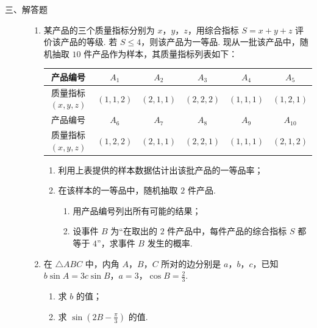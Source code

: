 \begin{description}

    \item[三、解答题]

    \begin{enumerate}[leftmargin=5pt]

      \addtocounter{enumi}{+14}

        \item 某产品的三个质量指标分别为 \(x\)，\(y\)，\(z\)，用综合指标 \(S = x + y + z\) 评价该产品的等级. 若 \(S \leqslant 4\)，则该产品为一等品. 现从一批该产品中，随机抽取 \(10\) 件产品作为样本，其质量指标列表如下：

\begin{center}
\begingroup
\small
\renewcommand{\arraystretch}{1.2}
\begin{tabular}{|c|c|c|c|c|c|}
\hline
产品编号 & \(A_1\) & \(A_2\) & \(A_3\) & \(A_4\) & \(A_5\) \\
\hline
质量指标 \((x,y,z)\) & \((1,1,2)\) & \((2,1,1)\) & \((2,2,2)\) & \((1,1,1)\) & \((1,2,1)\) \\
\hline
产品编号 & \(A_6\) & \(A_7\) & \(A_8\) & \(A_9\) & \(A_{10}\) \\
\hline
质量指标 \((x,y,z)\) & \((1,2,2)\) & \((2,1,1)\) & \((2,2,1)\) & \((1,1,1)\) & \((2,1,2)\) \\
\hline
\end{tabular}
\endgroup
\end{center}

\begin{enumerate}
\item 利用上表提供的样本数据估计出该批产品的一等品率；
\item 在该样本的一等品中，随机抽取 \(2\) 件产品.
\begin{enumerate}
\item 用产品编号列出所有可能的结果；
\item 设事件 \(B\) 为“在取出的 \(2\) 件产品中，每件产品的综合指标 \(S\) 都等于 \(4\)”，求事件 \(B\) 发生的概率.
\end{enumerate}
\end{enumerate}

        \item 在 \(\triangle ABC\) 中，内角 \(A\)，\(B\)，\(C\) 所对的边分别是 \(a\)，\(b\)，\(c\)，已知 \(b \sin A = 3c \sin B\)，\(a = 3\)，\(\cos B = \frac{2}{3}\).
\begin{enumerate}
\item 求 \(b\) 的值；
\item 求 \( \sin\left(2B-\frac{\pi}{3}\right) \) 的值.
\end{enumerate}


\end{enumerate}
\end{description}
